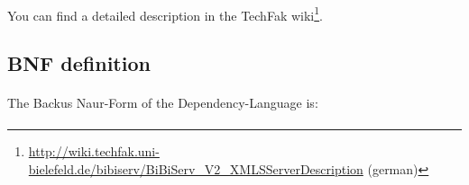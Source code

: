 \documentclass[a4paper,10pt]{book}
\begin{document}
\paragraph{} You can find a detailed description in the TechFak wiki\footnote{\url{http://wiki.techfak.uni-bielefeld.de/bibiserv/BiBiServ_V2_XMLSServerDescription} (german)}.

\subsection{BNF definition}
\paragraph{} The Backus Naur-Form of the Dependency-Language is:

\paragraph{}
\end{document}
